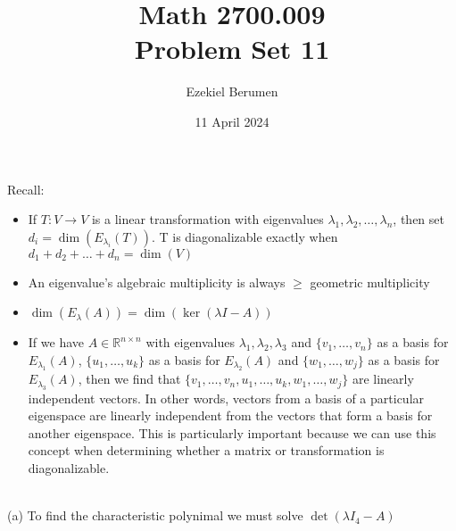 \documentclass{report}
\title{\Huge{Math 2700.009}\\Problem Set 11}
\author{\huge{Ezekiel Berumen}}
\date{11 April 2024}
\begin{document}
\maketitle
\newpage

\begin{note}
Recall:
\begin{itemize}
\item If $T: V \rightarrow V$ is a linear transformation with eigenvalues $\lambda_1, \lambda_2, \ldots, \lambda_n$, then set $d_i=\operatorname{dim}(E_{\lambda_{i}}(T))$. T is diagonalizable exactly when $d_1 + d_2 + \ldots + d_n = \operatorname{dim}(V)$
\item An eigenvalue's algebraic multiplicity is always $\ge$ geometric multiplicity
\item $\dim(E_\lambda(A)) = \dim(\ker(\lambda I - A))$
\item If we have $A\in\mathbb{R}^{n\times n}$ with eigenvalues $\lambda_1,  \lambda_2, \lambda_3$ and $\{v_1,\ldots,v_n\}$ as a basis for $E_{\lambda_1}(A)$,  $\{u_1,\ldots,u_k\}$ as a basis for $E_{\lambda_2}(A)$ and $\{w_1,\ldots,w_j\}$ as a basis for $E_{\lambda_3}(A)$,  then we find that $\{v_1,\ldots,v_n,u_1,\ldots,u_k,w_1,\ldots,w_j\}$ are linearly independent vectors.  In other words,  vectors from a basis of a particular eigenspace are linearly independent from the vectors that form a basis for another eigenspace.  This is particularly important because we can use this concept when determining whether a matrix or transformation is diagonalizable.
\end{itemize}
\end{note}
\sol \\
(a) To find the characteristic polynimal we must solve $\operatorname{det}(\lambda I_4 - A)$
\end{document}
